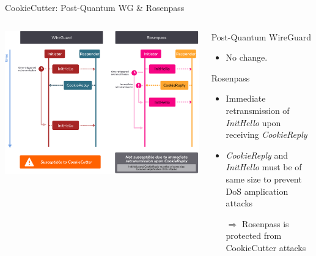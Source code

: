 \begin{frame}{CookieCutter: Post-Quantum WG \& Rosenpass}
  \begin{columns}[fullwidth,T]
    \begin{column}{.6\linewidth}
      \includegraphics[keepaspectratio,height=.85\textheight]{graphics/cookiecutter-compare.pdf}
    \end{column}

    \begin{column}{.4\linewidth}
      \begin{block}{Post-Quantum WireGuard}
      \begin{itemize}
        \item No change.
      \end{itemize}
      \end{block}

      \begin{block}{Rosenpass}
      \begin{itemize}
        \item Immediate retransmission of \emph{InitHello} upon receiving \emph{CookieReply}
        \item \emph{CookieReply} and \emph{InitHello} must be of same size to prevent DoS amplication attacks
        \item[$\Rightarrow$] Rosenpass is protected from CookieCutter attacks
      \end{itemize}
      \end{block}
    \end{column}
  \end{columns}
\end{frame}

